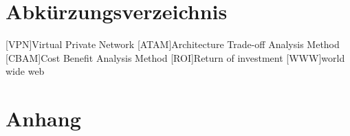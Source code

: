 \documentclass[Master,MSE,german]{twbook}
\newcommand{\listofcode}{\phantomsection\lstlistoflistings}
\begin{document}
\listofcode
\clearpage

{}
\chapter*{Abkürzungsverzeichnis}
\begin{acronym}[XXXXX]
    [VPN]{Virtual Private Network}
    [ATAM]{Architecture Trade-off Analysis Method}
    [CBAM]{Cost Benefit Analysis Method}
    [ROI]{Return of investment}
    [WWW]{world wide web}
\end{acronym}
\clearpage

{}
\chapter*{Anhang}
\end{document}
